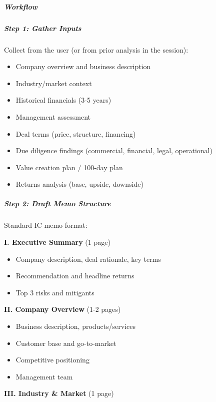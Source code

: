 \documentclass[11pt]{article}
\begin{document}
\subparagraph{Workflow}\mbox{}\par

\subparagraph{Step 1: Gather Inputs}\mbox{}\par

Collect from the user (or from prior analysis in the session):


\begin{itemize}[leftmargin=*,itemsep=2pt,topsep=2pt]
\item {} Company overview and business description
\item {} Industry/market context
\item {} Historical financials (3-5 years)
\item {} Management assessment
\item {} Deal terms (price, structure, financing)
\item {} Due diligence findings (commercial, financial, legal, operational)
\item {} Value creation plan / 100-day plan
\item {} Returns analysis (base, upside, downside)
\end{itemize}

\subparagraph{Step 2: Draft Memo Structure}\mbox{}\par

Standard IC memo format:


\textbf{I. Executive Summary} (1 page)

\begin{itemize}[leftmargin=*,itemsep=2pt,topsep=2pt]
\item {} Company description, deal rationale, key terms
\item {} Recommendation and headline returns
\item {} Top 3 risks and mitigants
\end{itemize}

\textbf{II. Company Overview} (1-2 pages)

\begin{itemize}[leftmargin=*,itemsep=2pt,topsep=2pt]
\item {} Business description, products/services
\item {} Customer base and go-to-market
\item {} Competitive positioning
\item {} Management team
\end{itemize}

\textbf{III. Industry \& Market} (1 page)
\end{document}
